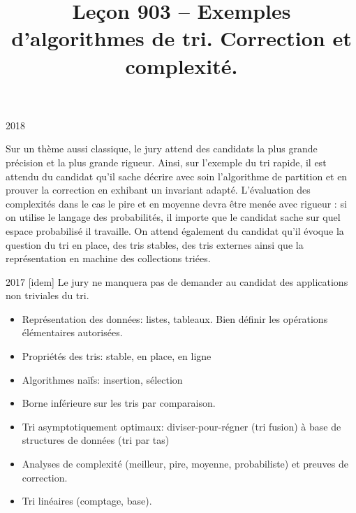 \documentclass{agregfiche}
\title{Leçon 903 -- Exemples d'algorithmes de tri. Correction et complexité.}
\begin{document}
\maketitle

\secrapports

\begin{rapport}{2018}
	
	Sur un thème aussi classique, le jury attend des candidats la plus grande précision et la plus grande rigueur.
	Ainsi, sur l'exemple du tri rapide, il est attendu du candidat qu'il sache décrire avec soin l'algorithme de partition et en prouver la correction en exhibant un invariant adapté. L'évaluation des complexités dans le cas le pire et en moyenne devra être menée avec rigueur : si on utilise le langage des probabilités, il importe que le candidat sache sur quel espace probabilisé il travaille.
	On attend également du candidat qu'il évoque la question du tri en place, des tris stables, des tris externes ainsi que la représentation en machine des collections triées.
	
\end{rapport}

\begin{rapport}{2017}
    [idem]
    Le jury ne manquera pas de demander au candidat des applications non triviales du tri.
\end{rapport}

\secindispensables

\begin{itemize}
    \item Représentation des données: listes, tableaux. Bien définir les opérations élémentaires autorisées.
    \item Propriétés des tris: stable, en place, en ligne
    \item Algorithmes naïfs: insertion, sélection
\end{itemize}

\secasavoir
\begin{itemize}
    \item Borne inférieure sur les tris par comparaison.
    \item Tri asymptotiquement optimaux: diviser-pour-régner (tri fusion) à base de structures de données (tri par tas)
	\item Analyses de complexité (meilleur, pire, moyenne, probabiliste) et preuves de correction.
	\item Tri linéaires (comptage, base).
\end{itemize}
\end{document}
